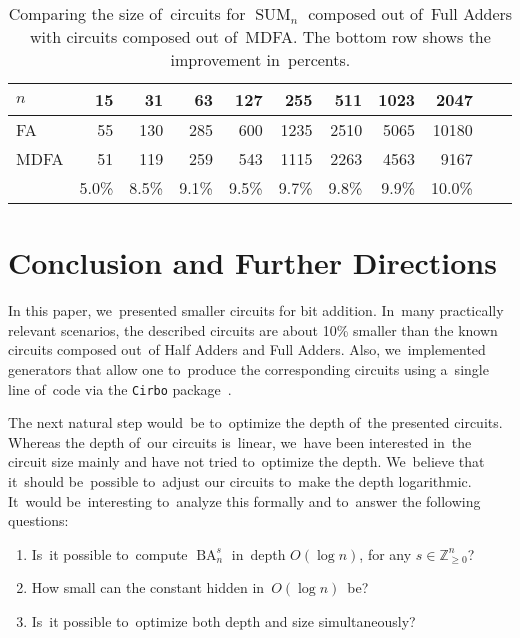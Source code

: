 \documentclass[sigconf, review, anonymous]{acmart}
\DeclareMathOperator{\SUM}{SUM}
\DeclareMathOperator{\BA}{BA}
\begin{document}
\begin{table}
	\begin{center}
		\small
		\begin{tabular}{lrrrrrrrrrr}
			\toprule
			$n$ & 15 & 31 & 63 & 127 & 255 & 511 & 1023 & 2047 \\
			\midrule
			FA & 55 & 130 & 285 & 600 & 1235 & 2510 & 5065 & 10180 \\
			MDFA & 51 & 119 & 259 & 543 & 1115 & 2263 & 4563 & 9167 \\
			& 5.0\%  & 8.5\%  & 9.1\%  & 9.5\%  & 9.7\%  & 9.8\%  & 9.9\%  & 10.0\% \\
			\bottomrule
		\end{tabular}
	\end{center}
	\caption{Comparing the size of~circuits for $\SUM_n$ composed out of~Full Adders with
	circuits composed out of~MDFA. The bottom row shows the improvement in~percents.}
	\label{table:first}
\end{table}


\section{Conclusion and Further Directions}

In this paper, we~presented smaller circuits for bit addition.
In~many practically relevant scenarios, the described circuits
are about 10\% smaller than the known circuits composed
out~of Half Adders and Full Adders.
Also, we~implemented generators that allow one
to~produce the corresponding circuits using a~single line of~code
via the \texttt{Cirbo} package~\cite{DBLP:journals/corr/abs-2412-14933}.

The next natural step would~be to~optimize the depth of~the presented circuits.
Whereas the depth of~our circuits is~linear,
we~have been interested in~the circuit size mainly and
have not tried to~optimize the depth. We~believe that it~should be~possible
to~adjust our circuits to~make the depth logarithmic. It~would be~interesting
to~analyze this formally and to~answer the following questions:
\begin{enumerate}
	\item Is~it possible to~compute $\BA_n^s$ in~depth $O(\log n)$, for any $s \in \mathbb{Z}_{\ge 0}^n$?
	\item How small can the constant hidden in~$O(\log n)$~be?
	\item Is~it possible to~optimize both depth and size simultaneously?
\end{enumerate}




\end{document}
